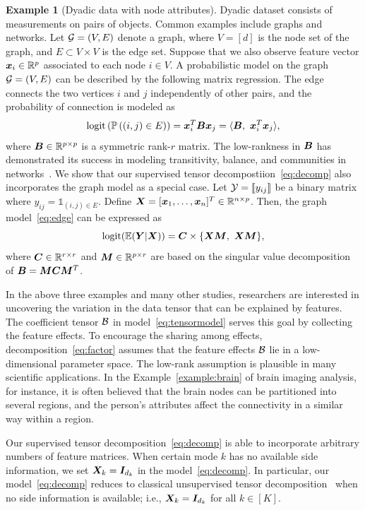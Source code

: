 \documentclass[12pt]{article}
\theoremstyle{definition}
\theoremstyle{definition}
\newtheorem{example}{Example}
\begin{document}
 \begin{example}[Dyadic data with node attributes] Dyadic dataset consists of measurements on pairs of objects. Common examples include graphs and networks. Let $\mathcal{G}=(V,E)$ denote a graph, where $V=[d]$ is the node set of the graph, and $E\subset V\times V$ is the edge set. Suppose that we also observe feature vector $\bm x_i\in\mathbb{R}^p$ associated to each node $i\in V$. A probabilistic model on the graph $\mathcal{G}=(V,E)$ can be described by the following matrix regression. The edge connects the two vertices $i$ and $j$ independently of other pairs, and the probability of connection is modeled as
\begin{equation}\label{eq:edge}
 \textup{logit}\left(\mathbb{P}\left((i,j)\in E\right)\right)=\mx^T_i\mB\mx_j=\langle \mB,\ \mx^T_i\mx_j\rangle,
 \end{equation}
 where $\bm B\in\mathbb{R}^{p\times p}$ is a symmetric rank-$r$ matrix. The low-rankness in $\bm B$ has demonstrated its success in modeling transitivity, balance, and communities in  networks~\citep{hoff2005bilinear}. We show that our supervised tensor decompostiion~\eqref{eq:decomp} also incorporates the graph model as a special case. Let $\mathcal{Y}=\llbracket y_{ij} \rrbracket$ be a binary matrix where $y_{ij}=\mathds{1}_{(i,j)\in E}$. Define $\bm X=[\bm x_1,\ldots,\bm x_n]^T\in\mathbb{R}^{n\times p}$. Then, the graph model~\eqref{eq:edge} can be expressed as
 \[
 \textup{logit}(\mathbb{E}(\mY|\mX))=\mC\times\{\mX\mM,\ \mX\mM\}, 
  \]
  where $\bm C\in\mathbb{R}^{r\times r}$ and $\bm M\in\mathbb{R}^{p\times r}$ are based on the singular value decomposition of $\bm B=\bm M\bm C\bm M^T$. 
  \end{example}


In the above three examples and many other studies, researchers are interested in uncovering the variation in the data tensor that can be explained by features. The coefficient tensor $\mathcal{B}$ in model~\eqref{eq:tensormodel} serves this goal by collecting the feature effects. To encourage the sharing among effects, decomposition~\eqref{eq:factor} assumes that the feature effects $\mathcal{B}$ lie in a low-dimensional parameter space. The low-rank assumption is plausible in many scientific applications. In the Example~\ref{example:brain} of brain imaging analysis, for instance, it is often believed that the brain nodes can be partitioned into several regions, and the person's attributes affect the connectivity in a similar way within a region. 


Our supervised tensor decomposition~\eqref{eq:decomp} is able to incorporate arbitrary numbers of feature matrices. When certain mode $k$ has no available side information, we set $\bm X_k=\bm I_{d_k}$ in the model~\eqref{eq:decomp}. In particular, our model~\eqref{eq:decomp} reduces to classical unsupervised tensor decomposition~\citep{de2000multilinear,hong2020generalized} when no side information is available; i.e., $\bm X_k=\bm I_{d_k}$ for all $k\in[K]$.
\end{document}
